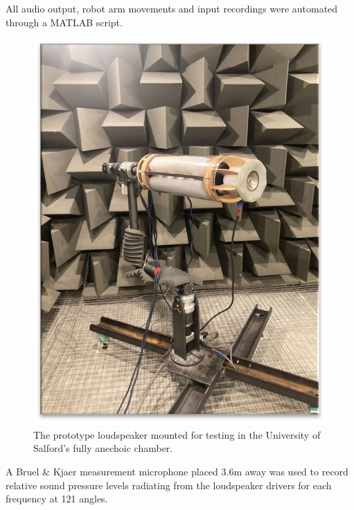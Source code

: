 \documentclass{report}
\begin{document}
        All audio output, robot arm movements and input recordings were automated through a MATLAB script.
        \begin{figure}[H]
            \centering
            \includegraphics[scale=1]{figs/speakerOnRobot.png}%
            \caption{The prototype loudspeaker mounted for testing in the University of Salford's fully anechoic chamber.}
            \label{speakerOnRobot}
        \end{figure}
        A Bruel \& Kjaer measurement microphone placed 3.6m away was used to record relative sound pressure levels radiating from the loudspeaker drivers for each frequency at 121 angles.
\end{document}

